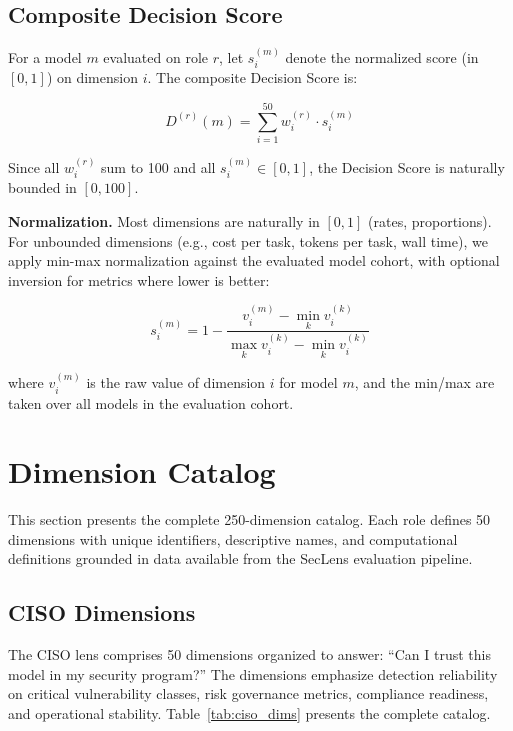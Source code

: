 \documentclass[10pt,twocolumn]{article}
\newcommand{\seclens}{SecLens\xspace}
\begin{document}
\subsection{Composite Decision Score}
\label{sec:composite}

For a model $m$ evaluated on role $r$, let $s_i^{(m)}$ denote the normalized score (in $[0, 1]$) on dimension $i$. The composite Decision Score is:

\begin{equation}
D^{(r)}(m) = \sum_{i=1}^{50} w_i^{(r)} \cdot s_i^{(m)}
\label{eq:decision_score}
\end{equation}

Since all $w_i^{(r)}$ sum to 100 and all $s_i^{(m)} \in [0, 1]$, the Decision Score is naturally bounded in $[0, 100]$.

\textbf{Normalization.} Most dimensions are naturally in $[0, 1]$ (rates, proportions). For unbounded dimensions (e.g., cost per task, tokens per task, wall time), we apply min-max normalization against the evaluated model cohort, with optional inversion for metrics where lower is better:

\begin{equation}
s_i^{(m)} = 1 - \frac{v_i^{(m)} - \min_k v_i^{(k)}}{\max_k v_i^{(k)} - \min_k v_i^{(k)}}
\label{eq:normalization}
\end{equation}

where $v_i^{(m)}$ is the raw value of dimension $i$ for model $m$, and the min/max are taken over all models in the evaluation cohort.

\section{Dimension Catalog}
\label{sec:catalog}

This section presents the complete 250-dimension catalog. Each role defines 50 dimensions with unique identifiers, descriptive names, and computational definitions grounded in data available from the \seclens evaluation pipeline.

\subsection{CISO Dimensions}
\label{sec:ciso_dims}

The CISO lens comprises 50 dimensions organized to answer: ``Can I trust this model in my security program?'' The dimensions emphasize detection reliability on critical vulnerability classes, risk governance metrics, compliance readiness, and operational stability. Table~\ref{tab:ciso_dims} presents the complete catalog.
\end{document}
